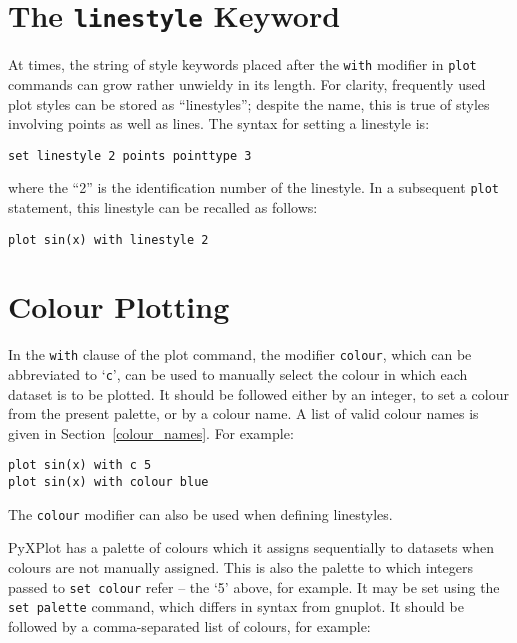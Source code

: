 \section{The {\tt linestyle} Keyword}

At times, the string of style keywords placed after the {\tt with} modifier
in {\tt plot} commands can grow rather unwieldy in its length. For clarity,
frequently used plot styles can be stored as ``linestyles''; despite the name,
this is true of styles involving points as well as lines. The syntax for
setting a linestyle is:

\begin{verbatim}
set linestyle 2 points pointtype 3
\end{verbatim}

\noindent where the ``2'' is the identification number of the linestyle. In a
subsequent {\tt plot} statement, this linestyle can be recalled as follows:

\begin{verbatim}
plot sin(x) with linestyle 2
\end{verbatim}

\section{Colour Plotting}

 In the {\tt with} clause of the plot
command, the modifier {\tt colour}, which can be abbreviated to
`{\tt c}', can be used to manually select the colour in which each dataset
is to be plotted. It should be followed either by an integer, to set a colour
from the present palette, or by a colour name. A list of valid colour names is
given in Section~\ref{colour_names}. For example:

\begin{verbatim}
plot sin(x) with c 5
plot sin(x) with colour blue
\end{verbatim}

\noindent The {\tt colour} modifier can also be used when defining linestyles.

 PyXPlot has a palette of colours which it assigns
sequentially to datasets when colours are not manually assigned. This is also
the palette to which integers passed to {\tt set colour} refer -- the `5'
above, for example. It may be set using the {\tt set palette} command, which
differs in syntax from gnuplot. It should be followed by a comma-separated list
of colours, for example:

